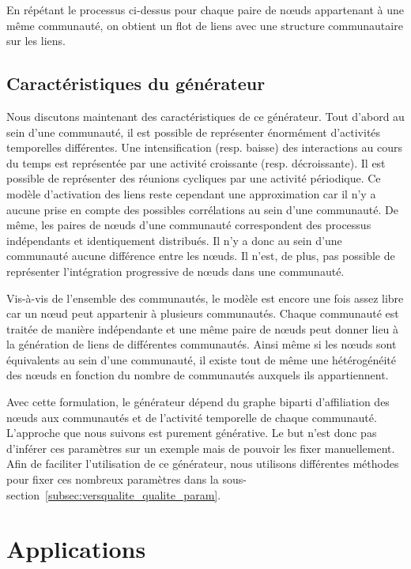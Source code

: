 En répétant le processus ci-dessus pour chaque paire de n\oe uds appartenant à une même communauté, on obtient un flot de liens avec une structure communautaire sur les liens.

\subsection{Caractéristiques du générateur}

Nous discutons maintenant des caractéristiques de ce générateur.
Tout d'abord au sein d'une communauté, il est possible de représenter énormément d'activités temporelles différentes.
Une intensification (resp. baisse) des interactions au cours du temps est représentée par une activité croissante (resp. décroissante).
Il est possible de représenter des réunions cycliques par une activité périodique. 
Ce modèle d'activation des liens reste  cependant une approximation car il n'y a aucune prise en compte des possibles corrélations au sein d'une communauté.
De même, les paires de n\oe uds d'une communauté correspondent des processus indépendants et identiquement distribués.
Il n'y a donc au sein d'une communauté aucune différence entre les n\oe uds.
Il n'est, de plus, pas possible de représenter l'intégration progressive de n\oe uds dans une communauté.

Vis-à-vis de l'ensemble des communautés, le modèle est encore une fois assez libre car un n\oe ud peut appartenir à plusieurs communautés.
Chaque communauté est traitée de manière indépendante et une même paire de n\oe uds peut donner lieu à la génération de liens de différentes communautés.
Ainsi même si les n\oe uds sont équivalents au sein d'une communauté, il existe tout de même une hétérogénéité des n\oe uds en fonction du nombre de communautés auxquels ils appartiennent.

\bigskip

Avec cette formulation, le générateur dépend du graphe biparti d'affiliation des n\oe uds aux communautés et de l'activité temporelle de chaque communauté.
L'approche que nous suivons est purement générative.
Le but n'est donc pas d'inférer ces paramètres sur un exemple mais de pouvoir les fixer manuellement.
Afin de faciliter l'utilisation de ce générateur, nous utilisons différentes méthodes pour fixer ces nombreux paramètres dans la sous-section~\ref{subsec:versqualite_qualite_param}.


\section{Applications}
\label{sec:versqualite_Applications}


